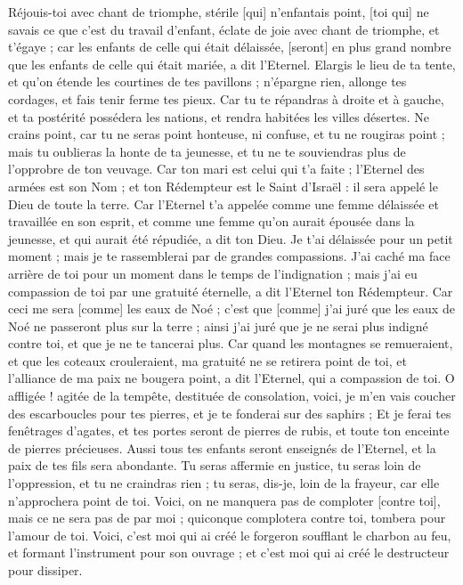 \begin{multicols}{2}
\VerseOne{}Réjouis-toi avec chant de triomphe, stérile [qui] n'enfantais point, [toi qui] ne savais ce que c'est du travail d'enfant, éclate de joie avec chant de triomphe, et t'égaye ; car les enfants de celle qui était délaissée, [seront] en plus grand nombre que les enfants de celle qui était mariée, a dit l'Eternel.
Elargis le lieu de ta tente, et qu'on étende les courtines de tes pavillons ; n'épargne rien, allonge tes cordages, et fais tenir ferme tes pieux.
Car tu te répandras à droite et à gauche, et ta postérité possédera les nations, et rendra habitées les villes désertes.
Ne crains point, car tu ne seras point honteuse, ni confuse, et tu ne rougiras point ; mais tu oublieras la honte de ta jeunesse, et tu ne te souviendras plus de l'opprobre de ton veuvage.
Car ton mari est celui qui t'a faite ; l'Eternel des armées est son Nom ; et ton Rédempteur est le Saint d'Israël : il sera appelé le Dieu de toute la terre.
Car l'Eternel t'a appelée comme une femme délaissée et travaillée en son esprit, et comme une femme qu'on aurait épousée dans la jeunesse, et qui aurait été répudiée, a dit ton Dieu.
Je t'ai délaissée pour un petit moment ; mais je te rassemblerai par de grandes compassions.
J'ai caché ma face arrière de toi pour un moment dans le temps de l'indignation ; mais j'ai eu compassion de toi par une gratuité éternelle, a dit l'Eternel ton Rédempteur.
Car ceci me sera [comme] les eaux de Noé ; c'est que [comme] j'ai juré que les eaux de Noé ne passeront plus sur la terre ; ainsi j'ai juré que je ne serai plus indigné contre toi, et que je ne te tancerai plus.
Car quand les montagnes se remueraient, et que les coteaux crouleraient, ma gratuité ne se retirera point de toi, et l'alliance de ma paix ne bougera point, a dit l'Eternel, qui a compassion de toi.
O affligée ! agitée de la tempête, destituée de consolation, voici, je m'en vais coucher des escarboucles pour tes pierres, et je te fonderai sur des saphirs ;
Et je ferai tes fenêtrages d'agates, et tes portes seront de pierres de rubis, et toute ton enceinte de pierres précieuses.
Aussi tous tes enfants seront enseignés de l'Eternel, et la paix de tes fils sera abondante.
Tu seras affermie en justice, tu seras loin de l'oppression, et tu ne craindras rien ; tu seras, dis-je, loin de la frayeur, car elle n'approchera point de toi.
Voici, on ne manquera pas de comploter [contre toi], mais ce ne sera pas de par moi ; quiconque complotera contre toi, tombera pour l'amour de toi.
Voici, c'est moi qui ai créé le forgeron soufflant le charbon au feu, et formant l'instrument pour son ouvrage ; et c'est moi qui ai créé le destructeur pour dissiper.

\end{multicols}
